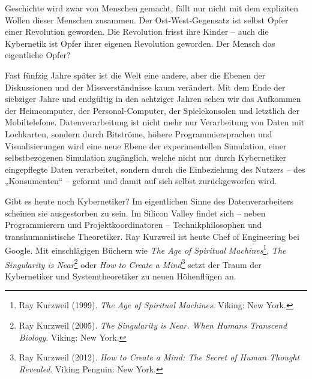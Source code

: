 \documentclass[a4paper,11pt]{article}
\begin{document}
Geschichte wird zwar von Menschen gemacht, fällt nur nicht mit dem expliziten
Wollen dieser Menschen zusammen. Der Ost-West-Gegensatz ist selbst Opfer einer
Revolution geworden. Die Revolution frisst ihre Kinder -- auch die Kybernetik
ist Opfer ihrer eigenen Revolution geworden. Der Mensch das eigentliche Opfer?

Fast fünfzig Jahre später ist die Welt eine andere, aber die Ebenen der
Diskussionen und der Missverständnisse kaum verändert.  Mit dem Ende der
siebziger Jahre und endgültig in den achtziger Jahren sehen wir das Aufkommen
der Heimcomputer, der Personal-Computer, der Spielekonsolen und letztlich der
Mobiltelefone.  Datenverarbeitung ist nicht mehr nur Verarbeitung von Daten
mit Lochkarten, sondern durch Bitströme, höhere Programmiersprachen und
Visualisierungen wird eine neue Ebene der experimentellen Simulation, einer
selbstbezogenen Simulation zugänglich, welche nicht nur durch Kybernetiker
eingepflegte Daten verarbeitet, sondern durch die Einbeziehung des Nutzers --
des „Konsumenten“ -- geformt und damit auf sich selbst zurückgeworfen wird.

Gibt es heute noch Kybernetiker? Im eigentlichen Sinne des Datenverarbeiters
scheinen sie ausgestorben zu sein. Im Silicon Valley findet sich -- neben
Programmierern und Projektkoordinatoren -- Technikphilosophen und
transhumanistische Theoretiker. Ray Kurzweil ist heute Chef of Engineering bei
Google. Mit einschlägigen Büchern wie \emph{The Age of Spiritual
  Machines}\footnote{Ray Kurzweil (1999). \emph{The Age of Spiritual
    Machines}. Viking: New York.}, \emph{The Singularity is Near}\footnote{Ray
  Kurzweil (2005). \emph{The Singularity is Near. When Humans Transcend
    Biology}. Viking: New York. } oder \emph{How to Create a
  Mind}\footnote{Ray Kurzweil (2012). \emph{How to Create a Mind: The Secret
    of Human Thought Revealed}. Viking Penguin: New York. } setzt der Traum
der Kybernetiker und Systemtheoretiker zu neuen Höhenflügen an.
\end{document}
